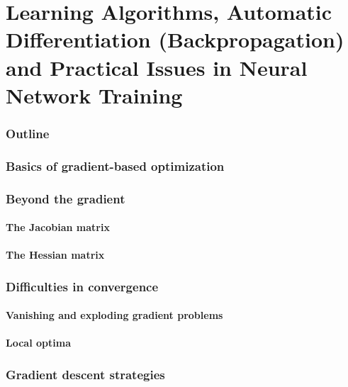 \renewcommand{\thispart}{4 }
\renewcommand{\thispartname}{
    Learning Algorithms, Automatic Differentiation (Backpropagation) and 
    Practical Issues in Neural Network Training}

\part{\thispartname}

\section{Outline}




\section{Basics of gradient-based optimization}

\section{Beyond the gradient}
\subsection{The Jacobian matrix}

\subsection{The Hessian matrix}


\section{Difficulties in convergence}

\subsection{Vanishing and exploding gradient problems}

\subsection{Local optima}

\section{Gradient descent strategies}

